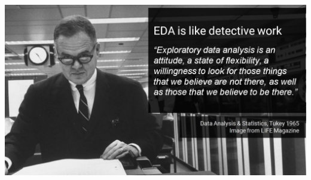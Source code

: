 \documentclass[aspectratio=169]{../latex_main/tntbeamer}  %
\begin{document}
	
	
	\begin{frame}
	    \centering
	    \includegraphics[scale=.38]{Bild7}
	\end{frame}
\end{document}
